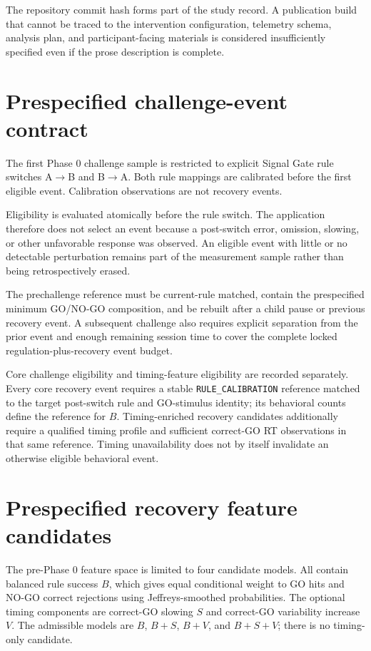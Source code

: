 \documentclass[man]{apa7}
\begin{document}
The repository commit hash forms part of the study record. A publication build that cannot be traced to the intervention configuration, telemetry schema, analysis plan, and participant-facing materials is considered insufficiently specified even if the prose description is complete.



\section{Prespecified challenge-event contract}

The first Phase 0 challenge sample is restricted to explicit Signal Gate rule switches A\(\rightarrow\)B and B\(\rightarrow\)A. Both rule mappings are calibrated before the first eligible event. Calibration observations are not recovery events.

Eligibility is evaluated atomically before the rule switch. The application therefore does not select an event because a post-switch error, omission, slowing, or other unfavorable response was observed. An eligible event with little or no detectable perturbation remains part of the measurement sample rather than being retrospectively erased.

The prechallenge reference must be current-rule matched, contain the prespecified minimum GO/NO-GO composition, and be rebuilt after a child pause or previous recovery event. A subsequent challenge also requires explicit separation from the prior event and enough remaining session time to cover the complete locked regulation-plus-recovery event budget.

Core challenge eligibility and timing-feature eligibility are recorded separately. Every core recovery event requires a stable \texttt{RULE\_CALIBRATION} reference matched to the target post-switch rule and GO-stimulus identity; its behavioral counts define the reference for \(B\). Timing-enriched recovery candidates additionally require a qualified timing profile and sufficient correct-GO RT observations in that same reference. Timing unavailability does not by itself invalidate an otherwise eligible behavioral event.

\section{Prespecified recovery feature candidates}

The pre-Phase 0 feature space is limited to four candidate models. All contain balanced rule success \(B\), which gives equal conditional weight to GO hits and NO-GO correct rejections using Jeffreys-smoothed probabilities. The optional timing components are correct-GO slowing \(S\) and correct-GO variability increase \(V\). The admissible models are \(B\), \(B+S\), \(B+V\), and \(B+S+V\); there is no timing-only candidate.
\end{document}
